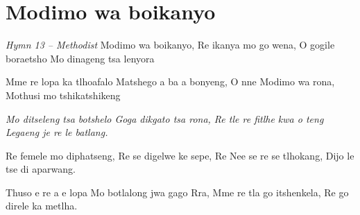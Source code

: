 \starttocol
\chapter{Modimo wa boikanyo}
\nexttocol
\hfill{\it Hymn 13 -- Methodist}
\stoptocol
\starttocol
\startlines
{\sc Modimo} wa boikanyo,
Re ikanya mo go wena,
O gogile boraetsho
Mo dinageng tsa lenyora

Mme re lopa ka tlhoafalo
Matshego a ba a bonyeng,
O nne Modimo wa rona,
Mothusi mo tshikatshikeng

{\it Mo ditseleng tsa botshelo
Goga dikgato tsa rona,
Re tle re fitlhe kwa o teng
Legaeng je re le batlang.}

Re femele mo diphatseng,
Re se digelwe ke sepe,
Re Nee se re se tlhokang,
Dijo le tse di aparwang.

Thuso e re a e lopa
Mo botlalong jwa gago Rra,
Mme re tla go itshenkela,
Re go direle ka metlha.
\stoplines
\nexttocol

\stoptocol
